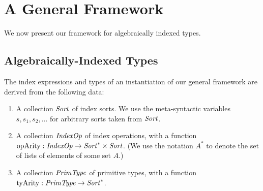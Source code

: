 \section{A General Framework}
\label{sec:a-general-framework}

We now present our framework for algebraically
indexed types. %

\subsection{Algebraically-Indexed Types}
\label{sec:algebraically-indexed-types}

The index expressions and types of an instantiation of our general
framework are derived from the following data:
\begin{enumerate}
\item A collection $\mathit{Sort}$ of index sorts. We use the
  meta-syntactic variables $s,s_1,s_2,...$ for arbitrary sorts taken
  from $\mathit{Sort}$.
\item A collection $\mathit{IndexOp}$ of index operations, with a function
  $\mathrm{opArity} : \mathit{IndexOp} \to \mathit{Sort}^* \times \mathit{Sort}$. (We use
  the notation $A^*$ to denote the set of lists of elements of some
  set $A$.)
\item A collection $\mathit{PrimType}$ of primitive types, with a function
  $\mathrm{tyArity} : \mathit{PrimType} \to \mathit{Sort}^*$. %
\end{enumerate}

